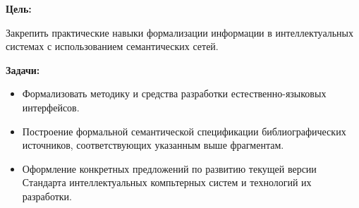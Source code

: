 
\textbf{Цель:}

Закрепить практические навыки формализации информации в интеллектуальных системах с использованием семантических сетей.
\bigskip

\textbf{Задачи:}

\begin{itemize}
    \item Формализовать методику и средства разработки естественно-языковых интерфейсов.
    \item Построение формальной семантической спецификации библиографических источников, соответствующих указанным выше фрагментам.
    \item Оформление конкретных предложений по развитию текущей версии Стандарта интеллектуальных компьтерных систем и технологий их разработки.
\end{itemize}